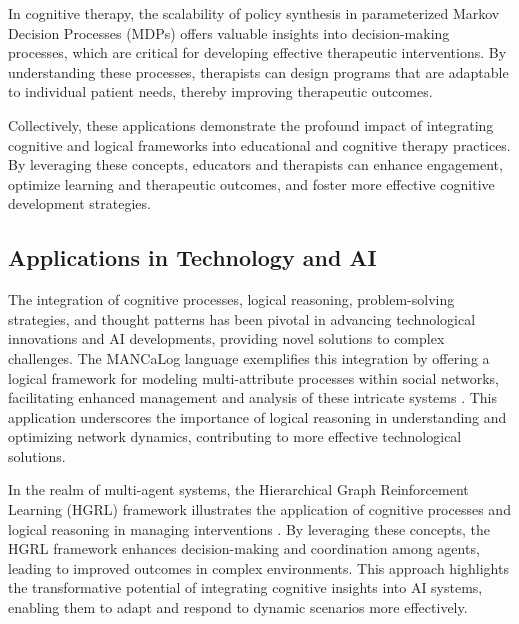In cognitive therapy, the scalability of policy synthesis in parameterized Markov Decision Processes (MDPs) offers valuable insights into decision-making processes, which are critical for developing effective therapeutic interventions. By understanding these processes, therapists can design programs that are adaptable to individual patient needs, thereby improving therapeutic outcomes.

Collectively, these applications demonstrate the profound impact of integrating cognitive and logical frameworks into educational and cognitive therapy practices. By leveraging these concepts, educators and therapists can enhance engagement, optimize learning and therapeutic outcomes, and foster more effective cognitive development strategies.


\subsection{Applications in Technology and AI} \label{subsec:Applications in Technology and AI}



The integration of cognitive processes, logical reasoning, problem-solving strategies, and thought patterns has been pivotal in advancing technological innovations and AI developments, providing novel solutions to complex challenges. The MANCaLog language exemplifies this integration by offering a logical framework for modeling multi-attribute processes within social networks, facilitating enhanced management and analysis of these intricate systems \cite{shakarian2022reasoningcomplexnetworkslogic}. This application underscores the importance of logical reasoning in understanding and optimizing network dynamics, contributing to more effective technological solutions.



In the realm of multi-agent systems, the Hierarchical Graph Reinforcement Learning (HGRL) framework illustrates the application of cognitive processes and logical reasoning in managing interventions \cite{chen2024adaptivenetworkinterventioncomplex}. By leveraging these concepts, the HGRL framework enhances decision-making and coordination among agents, leading to improved outcomes in complex environments. This approach highlights the transformative potential of integrating cognitive insights into AI systems, enabling them to adapt and respond to dynamic scenarios more effectively.



